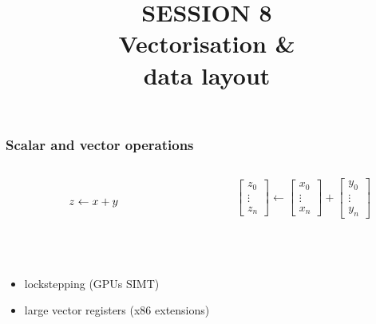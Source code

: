 \documentclass[14pt,aspectratio=169,dvipsnames,table]{beamer}
\begin{document}
\title{\firasemibold\color{White}%
  {\fontsize{20}{0}\selectfont SESSION 8\\
    \fontsize{34}{34}\selectfont Vectorisation \&\\data layout\par}}
\titleslide




\begin{frame}
  \frametitle{Scalar and vector operations}
  \begin{columns}
    \begin{column}{0.3\textwidth}
      \begin{equation*}
        \phantom{%
          \begin{bmatrix}
            z_0 \\ \vdots \\ z_n
          \end{bmatrix}}
        z \gets x + y
        \phantom{%
          \begin{bmatrix}
            z_0 \\ \vdots \\ z_n
          \end{bmatrix}}
      \end{equation*}\centering
    \end{column}

    \begin{column}{0.3\textwidth}
      \begin{equation*}
        \begin{bmatrix}
          z_0 \\ \vdots \\ z_n
        \end{bmatrix}
        \gets
        \begin{bmatrix}
          x_0 \\ \vdots \\ x_n
        \end{bmatrix}
        +
        \begin{bmatrix}
          y_0 \\ \vdots \\ y_n
        \end{bmatrix}
      \end{equation*}\centering
    \end{column}
  \end{columns}

  \vskip 21pt

  \\[-10pt
  ]
  \begin{itemize}[itemsep=7pt]
  \item lockstepping (GPUs SIMT)
  \item large vector registers (x86 extensions)
  \end{itemize}
\end{frame}
\end{document}

